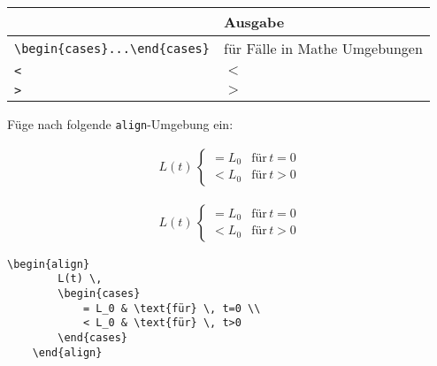 \documentclass["WS\space 16-17\space -\space LaTeX-Kurs\space -\space Praesentation\space -\space 1.tex"]{subfiles}
\begin{document}
\begin{frame}[fragile]
	\begin{center}
		\begin{tabular}{ll}
			\toprule
			\color{math-cmd}{Mathe}\color{black}{-Befehl}									&	Ausgabe		\\ \midrule
			\lstinline|\begin{cases}...\end{cases}|	&	für Fälle in Mathe Umgebungen	\\
			\lstinline|<|							&	$<$		\\
			\lstinline|>|							&	$>$		\\
			\bottomrule
		\end{tabular}
	\end{center}
	\pause\btVFill
	\Aufgabee
	Füge nach  folgende \lstinline[basicstyle=\normalfont\normalsize]|align|-Umgebung ein:
	\begin{outputbox}
	    \begin{align}
	      L(t) \,
	      \begin{cases}
	        = L_0 & \text{für} \, t=0 \\
	        < L_0 & \text{für} \, t>0
	      \end{cases}
	    \end{align}
    \end{outputbox}
	\vspace{0.3cm}
\end{frame}
\begin{frame}[fragile]
	\Losung
	\begin{outputbox}
	    \begin{align}
			L(t) \,
			\begin{cases}
				= L_0 & \text{für} \, t=0 \\
				< L_0 & \text{für} \, t>0
			\end{cases}
	    \end{align}
	\end{outputbox}

	\Code
	\begin{lstlisting}[gobble=4]
	\begin{align}
		L(t) \,
		\begin{cases}
			= L_0 & \text{für} \, t=0 \\
			< L_0 & \text{für} \, t>0
		\end{cases}
	\end{align}
	\end{lstlisting}
\end{frame}
\end{document}
